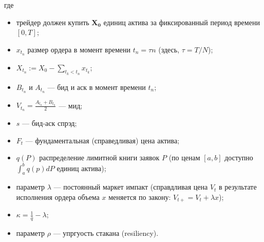где
\begin{itemize}
 \item трейдер должен купить $\mathbf{X_0}$ единиц актива за фиксированный период времени $[0,T]$;
 \item $x_{t_n}$ размер ордера в момент времени $t_n = \tau n$ (здесь, $\tau = T / N$); 
 \item $X_{t_n} := X_0 - \sum _{t_k < t_n} x_{t_k}$;
 \item $B_{t_n}$ и $A_{t_n}$ --- бид и аск в момент времени $t_n$; 
 \item $V_{t_n} = \frac{A_{t_n} + B_{t_n}}{2}$ --- мид; 
 \item $s$ --- бид-аск спрэд;
 \item $F_t$ --- фундаментальная (справедливая) цена актива;
 \item $q(P)$ распределение лимитной книги заявок $P$ (по ценам $[a, b]$ доступно $\int_a^b q(p) dP$ единиц актива);
 \item параметр $\lambda$ --- постоянный маркет импакт (справдливая цена $V_t$ в результате исполнения ордера объема $x$ меняется по закону: $V_{t+} = V_t + \lambda x$);
  \item $\kappa = \frac{1}{q} - \lambda $;
 \item параметр $\rho$ --- упргуость стакана (resiliency).
\end{itemize}

